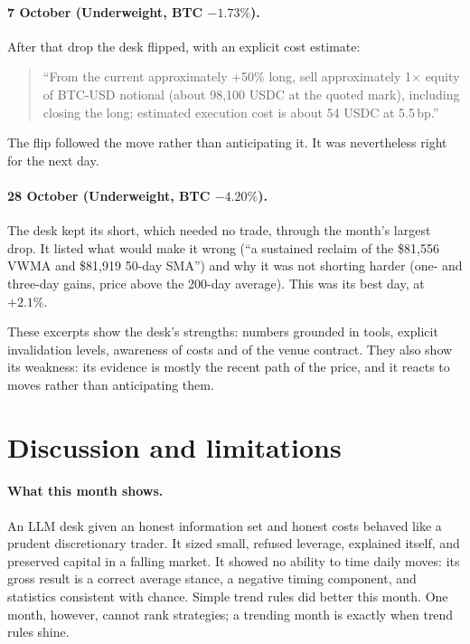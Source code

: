 \paragraph{7 October (Underweight, BTC $-1.73\%$).} After that drop the desk flipped, with an explicit cost estimate:
\begin{quote}\small
``From the current approximately +50\% long, sell approximately 1$\times$ equity of BTC-USD notional (about 98,100 USDC at the quoted mark), including closing the long; estimated execution cost is about 54 USDC at 5.5\,bp.''
\end{quote}
The flip followed the move rather than anticipating it. It was nevertheless right for the next day.

\paragraph{28 October (Underweight, BTC $-4.20\%$).} The desk kept its short, which needed no trade, through the month's largest drop. It listed what would make it wrong (``a sustained reclaim of the \$81,556 VWMA and \$81,919 50-day SMA'') and why it was not shorting harder (one- and three-day gains, price above the 200-day average). This was its best day, at $+2.1\%$.

These excerpts show the desk's strengths: numbers grounded in tools, explicit invalidation levels, awareness of costs and of the venue contract. They also show its weakness: its evidence is mostly the recent path of the price, and it reacts to moves rather than anticipating them.

\section{Discussion and limitations}\label{sec:discussion}

\paragraph{What this month shows.} An LLM desk given an honest information set and honest costs behaved like a prudent discretionary trader. It sized small, refused leverage, explained itself, and preserved capital in a falling market. It showed no ability to time daily moves: its gross result is a correct average stance, a negative timing component, and statistics consistent with chance. Simple trend rules did better this month. One month, however, cannot rank strategies; a trending month is exactly when trend rules shine.

